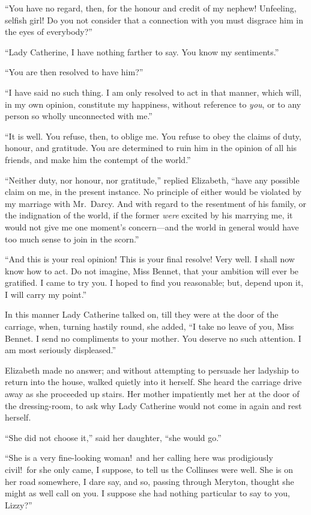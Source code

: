 \documentclass[12pt,english,oneside]{book}
\begin{document}
{}``You have no regard, then, for the honour and credit of my nephew!
Unfeeling, selfish girl! Do you not consider that a connection with
you must disgrace him in the eyes of everybody?''\ 

{}``Lady Catherine, I have nothing farther to say. You know my sentiments.''

{}``You are then resolved to have him?''\ 

{}``I have said no such thing. I am only resolved to act in that
manner, which will, in my own opinion, constitute my happiness, without
reference to \textit{you}, or to any person so wholly unconnected
with me.''

{}``It is well. You refuse, then, to oblige me. You refuse to obey
the claims of duty, honour, and gratitude. You are determined to ruin
him in the opinion of all his friends, and make him the contempt of
the world.''

{}``Neither duty, nor honour, nor gratitude,'' replied Elizabeth,
{}``have any possible claim on me, in the present instance. No principle
of either would be violated by my marriage with Mr.\ Darcy. And with
regard to the resentment of his family, or the indignation of the
world, if the former \textit{were} excited by his marrying me, it
would not give me one moment's concern\mbox{---}and the world in
general would have too much sense to join in the scorn.''

{}``And this is your real opinion! This is your final resolve! Very
well. I shall now know how to act. Do not imagine, Miss Bennet, that
your ambition will ever be gratified. I came to try you. I hoped to
find you reasonable; but, depend upon it, I will carry my point.''

In this manner Lady Catherine talked on, till they were at the door
of the carriage, when, turning hastily round, she added, {}``I take
no leave of you, Miss Bennet. I send no compliments to your mother.
You deserve no such attention. I am most seriously displeased.''

Elizabeth made no answer; and without attempting to persuade her ladyship
to return into the house, walked quietly into it herself. She heard
the carriage drive away as she proceeded up stairs. Her mother impatiently
met her at the door of the dressing-room, to ask why Lady Catherine
would not come in again and rest herself.

{}``She did not choose it,'' said her daughter, {}``she would go.''

{}``She is a very fine-looking woman!\ and her calling here was
prodigiously civil!\ for she only came, I suppose, to tell us the
Collinses were well. She is on her road somewhere, I dare say, and
so, passing through Meryton, thought she might as well call on you.
I suppose she had nothing particular to say to you, Lizzy?''\ 
\end{document}
